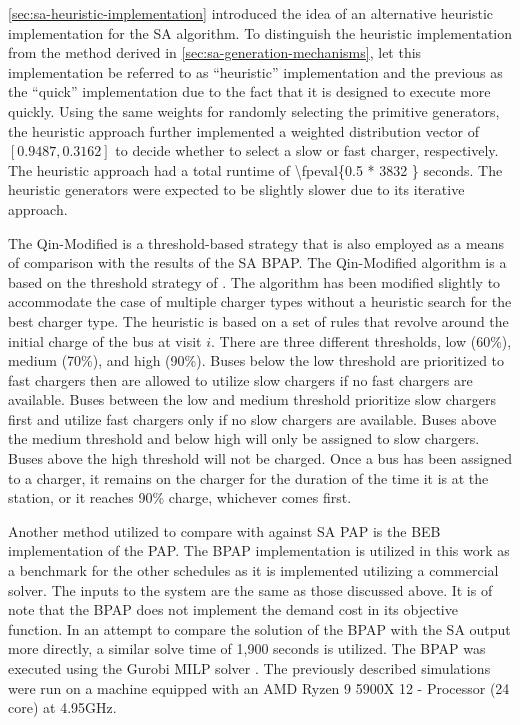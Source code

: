 \documentclass[energies,article,submit,moreauthors]{Definitions/mdpi}
\newcommand{\tempcnt}{3832 }                                                    %
\newcommand{\heuristiclocal}{0.5 }                                              %
\begin{document}
\ref{sec:sa-heuristic-implementation} introduced the idea of an alternative heuristic implementation for the SA algorithm. To
distinguish the heuristic implementation from the method derived in \ref{sec:sa-generation-mechanisms}, let this
implementation be referred to as ``heuristic'' implementation and the previous as the ``quick'' implementation due to the
fact that it is designed to execute more quickly. Using the same weights for randomly selecting the primitive
generators, the heuristic approach further implemented a weighted distribution vector of \([0.9487, 0.3162]\) to decide
whether to select a slow or fast charger, respectively. The heuristic approach had a total runtime of
\num{\fpeval{\heuristiclocal * \tempcnt}} seconds. The heuristic generators were expected to be slightly
slower due to its iterative approach.

The Qin-Modified is a threshold-based strategy that is also employed as a means of comparison with the results of the SA
BPAP. The Qin-Modified algorithm is a based on the threshold strategy of \cite{qin-2016-numer-analy}. The algorithm has
been modified slightly to accommodate the case of multiple charger types without a heuristic search for the best charger
type. The heuristic is based on a set of rules that revolve around the initial charge of the bus at visit \(i\). There are
three different thresholds, low (60\%), medium (70\%), and high (90\%). Buses below the low threshold are prioritized to
fast chargers then are allowed to utilize slow chargers if no fast chargers are available. Buses between the low and
medium threshold prioritize slow chargers first and utilize fast chargers only if no slow chargers are available. Buses
above the medium threshold and below high will only be assigned to slow chargers. Buses above the high threshold will
not be charged. Once a bus has been assigned to a charger, it remains on the charger for the duration of the time it is
at the station, or it reaches 90\% charge, whichever comes first.

Another method utilized to compare with against SA PAP is the BEB implementation of the PAP. The BPAP implementation is
utilized in this work as a benchmark for the other schedules as it is implemented utilizing a commercial solver. The
inputs to the system are the same as those discussed above. It is of note that the BPAP does not implement the demand
cost in its objective function. In an attempt to compare the solution of the BPAP with the SA output more directly, a
similar solve time of 1,900 seconds is utilized. The BPAP was executed using the Gurobi MILP solver
\cite{gurobi-2021-gurob-optim}. The previously described simulations were run on a machine equipped with an AMD Ryzen 9
5900X 12 - Processor (24 core) at 4.95GHz.
\end{document}
